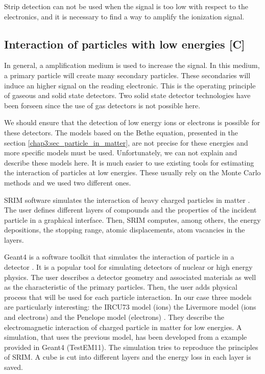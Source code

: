 \begin{refsection}
  Strip detection can not be used when the signal is too low with respect to the electronics, and it is necessary to find a way to amplify the ionization signal.

  \subsection{Interaction of particles with low energies [C]}
  \label{chap3:low_energy}
  In general, a amplification medium is used to increase the signal. In this medium, a primary particle will create many secondary particles. These secondaries will induce an higher signal on the reading electronic. This is the operating principle of gaseous and solid state detectors. Two solid state detector technologies have been forseen since the use of gas detectors is not possible here.

  We should ensure that the detection of low energy ions or electrons is possible for these detectors. The models based on the Bethe equation, presented in the section \ref{chap3:sec_particle_in_matter}, are not precise for these energies and more specific models must be used. Unfortunately, we can not explain and describe these models here. It is much easier to use existing tools for estimating the interaction of particles at low energies. These usually rely on the Monte Carlo methods and we used two different ones.

  SRIM software simulates the interaction of heavy charged particles in matter \cite{srim2013}. The user defines different layers of compounds and the properties of the incident particle in a graphical interface. Then, SRIM computes, among others, the energy depositions, the stopping range, atomic displacements, atom vacancies in the layers.

  Geant4 is a software toolkit that simulates the interaction of particle in a detector \cite{Allison2006, Allison2016}. It is a popular tool for simulating detectors of nuclear or high energy physics. The user describes a detector geometry and associated materials as well as the characteristic of the primary particles. Then, the user adds physical process that will be used for each particle interaction. In our case three models are particularly interesting: the IRCU73 model (ions) the Livermore model (ions and electrons) and the Penelope model (electrons) \cite{Bimbot73,livermore97, salvat2009}. They describe the electromagnetic interaction of charged particle in matter for low energies. A simulation, that uses the previous model, has been developed from a example provided in Geant4 (TestEM11). The simulation tries to reproduce the principles of SRIM. A cube is cut into different layers and the energy loss in each layer is saved.


\end{refsection}

